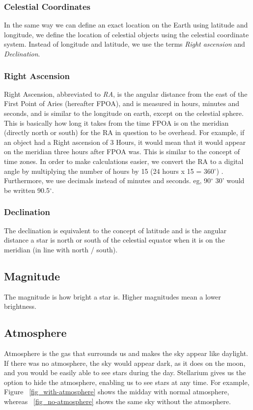 \subsubsection{Celestial Coordinates}
In the same way we can define an exact location on the Earth using latitude and longitude, we define the location of celestial objects using the celestial coordinate system. Instead of longitude and latitude, we use the terms \textit{Right ascension} and \textit{Declination}. 

\subsubsection{Right Ascension}
Right Ascension, abbreviated to \textit{RA}, is the angular distance from the east of the First Point of Aries (hereafter FPOA), and is measured in hours, minutes and seconds, and is similar to the longitude on earth, except on the celestial sphere. This is basically how long it takes from the time FPOA is on the meridian (directly north or south) for the RA in question to be overhead. For example, if an object had a Right ascension of 3 Hours, it would mean that it would appear on the meridian three hours after FPOA was.  This is similar to the concept of time zones. In order to make calculations easier, we convert the RA to a digital angle by multiplying the number of hours by 15 (24 hours x 15 = 360$^{\circ}$) . Furthermore, we use decimals instead of minutes and seconds. eg, 90$^{\circ}$ 30' would be written 90.5$^{\circ}$. 

\subsubsection{Declination}
The declination is equivalent to the concept of latitude and is the angular distance a star is north or south of the celestial equator when it is on the meridian (in line with north / south).  

\subsection{Magnitude}
The magnitude is how bright a star is. Higher magnitudes mean a lower brightness.

\subsection{Atmosphere}
Atmosphere is the gas that surrounds us and makes the sky appear like daylight. If there was no atmosphere, the sky would appear dark, as it does on the moon, and you would be easily able to see stars during the day. Stellarium gives us the option to hide the atmosphere, enabling us to see stars at any time. For example, Figure ~\ref{fig_with-atmosphere} shows the midday with normal atmosphere, whereas ~\ref{fig_no-atmosphere} shows the same sky without the atmosphere.

